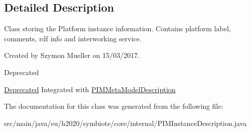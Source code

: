 \subsection{Detailed Description}
Class storing the Platform instance information. Contains platform label, comments, rdf info and interworking service.

Created by Szymon Mueller on 15/03/2017.

\begin{DoxyRefDesc}{Deprecated}
\item[\hyperlink{deprecated__deprecated000001}{Deprecated}]Integrated with \hyperlink{classeu_1_1h2020_1_1symbiote_1_1core_1_1internal_1_1PIMMetaModelDescription}{P\+I\+M\+Meta\+Model\+Description} \end{DoxyRefDesc}


The documentation for this class was generated from the following file\+:\begin{DoxyCompactItemize}
\item 
src/main/java/eu/h2020/symbiote/core/internal/P\+I\+M\+Instance\+Description.\+java\end{DoxyCompactItemize}

